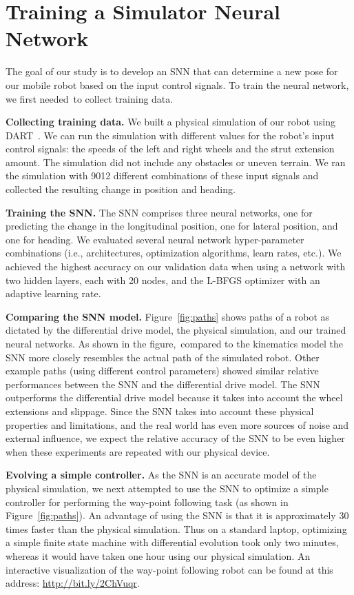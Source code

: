 
\section{Training a Simulator Neural Network}

The goal of our study is to develop an SNN that can determine a new pose for our mobile robot based on the input control signals. To train the neural network, we first needed to collect training data.

\noindent
\textbf{Collecting training data.}
%
We built a physical simulation of our robot using DART~\citep{Lee.2018.JOSS.DARTDynamicAnimation}.
%
We can run the simulation with different values for the robot’s input control signals: the speeds of the left and right wheels and the strut extension amount. The simulation did not include any obstacles or uneven terrain.
%
We ran the simulation with 9012 different combinations of these input signals and collected the resulting change in position and heading.

\noindent
\textbf{Training the SNN.}
%
The SNN comprises three neural networks, one for predicting the change in the longitudinal position, one for lateral position, and one for heading.
%
We evaluated several neural network hyper-parameter combinations (i.e., architectures, optimization algorithms, learn rates, etc.). We achieved the highest accuracy on our validation data when using a network with two hidden layers, each with 20 nodes, and the L-BFGS optimizer with an adaptive learning rate.

\noindent
\textbf{Comparing the SNN model.} Figure~\ref{fig:paths} shows paths of a robot as dictated by the differential drive model, the physical simulation, and our trained neural networks.
%
As shown in the figure, compared to the kinematics model the SNN more closely resembles the actual path of the simulated robot.
%
Other example paths (using different control parameters) showed similar relative performances between the SNN and the differential drive model.
%
The SNN outperforms the differential drive model because it takes into account the wheel extensions and slippage.
%
Since the SNN takes into account these physical properties and limitations, and the real world has even more sources of noise and external influence, we expect the relative accuracy of the SNN to be even higher when these experiments are repeated with our physical device.

\noindent
\textbf{Evolving a simple controller.}
%
As the SNN is an accurate model of the physical simulation, we next attempted to use the SNN to optimize a simple controller for performing the way-point following task (as shown in Figure~\ref{fig:paths}).
An advantage of using the SNN is that it is approximately 30 times faster than the physical simulation. Thus on a standard laptop, optimizing a simple finite state machine with differential evolution took only two minutes, whereas it would have taken one hour using our physical simulation.
%
An interactive visualization of the way-point following robot can be found at this address: \url{http://bit.ly/2ChVuqr}.


